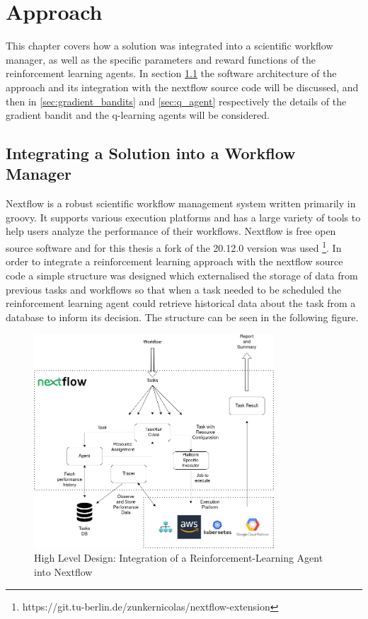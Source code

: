 
\cleardoublepage
\chapter{Approach}
\label{cha:approach}


This chapter covers how a solution was integrated into a scientific workflow manager, as well as the specific parameters and reward functions of the reinforcement learning agents. In section \ref{sec:integration} the software architecture of the approach and its integration with the nextflow source code will be discussed, and then in \ref{sec:gradient_bandits} and \ref{sec:q_agent} respectively the details of the gradient bandit and the q-learning agents will be considered. 

\section{Integrating a Solution into a Workflow Manager}
\label{sec:integration}

Nextflow \cite{nextflow} is a robust scientific workflow management system written primarily in groovy. It supports various execution platforms and has a large variety of tools to help users analyze the performance of their workflows. Nextflow is free open source software and for this thesis a fork of the 20.12.0 version was used \footnote{https://git.tu-berlin.de/zunkernicolas/nextflow-extension}. In order to integrate a reinforcement learning approach with the nextflow source code a simple structure was designed which externalised the storage of data from previous tasks and workflows so that when a task needed to be scheduled the reinforcement learning agent could retrieve historical data about the task from a database to inform its decision. The structure can be seen in the following figure.

\begin{figure}[ht]
    \centering
        \includegraphics[width=0.8\textwidth]{fig/implementation_diagram.png}
        \caption{High Level Design: Integration of a Reinforcement-Learning Agent into Nextflow}
        \label{fig:implementation}
\end{figure}

